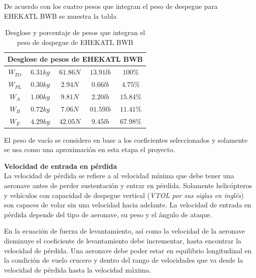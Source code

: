 De acuerdo con los cuatro pesos que integran el peso de despegue para EHEKATL BWB se muestra la tabla 
\begin{table}[!h]
    \centering
    \begin{tabular}{|c|c|c|c|c|}
    \hline
    \multicolumn{5}{|c|}{Desglose de pesos de EHEKATL BWB}\\
    \hline
     \textbf{$W_{TO}$} & \textbf{$6.31 kg$} & \textbf{$61.86 N$} & \textbf{$13.91 lb$} & $100 \% $  \\
     \hline
      $W_{PL}$ & \textit{$0.30 kg$} & \textit{$2.94  N$} & \textit{$0.66 lb$} & $ 4.75 \% $\\
      $W_{A}$  & \textit{$1.00 kg$} & \textit{$9.81  N$} & \textit{$2.20  lb$} &  $ 15.84 \% $  \\
      $W_{B}$  & \textit{$0.72 kg$} & \textit{$7.06  N$} & \textit{$01.59 lb$} &  $ 11.41 \% $ \\
      $W_{E}$  & \textit{$4.29 kg$} & \textit{$42.05  N$} & \textit{$9.45 lb$} &  $ 67.98 \% $ \\
    \hline
    \end{tabular}
    \caption{Desglose y porcentaje de pesos que integran el peso de despegue de EHEKATL BWB}
    \label{desglose y porcentaje de pesos}
\end{table}


El peso de vacío se considero en base a los coeficientes seleccionados y solamente  se usa como una aproximación en esta etapa el proyecto.

\bigskip
\textbf{Velocidad de entrada en pérdida}\\
La velocidad de pérdida se refiere a al velocidad mínima que debe tener una aeronave antes de perder sustentación y entrar en pérdida. Solamente helicópteros y vehículos con capacidad de despegue vertical (\textit{VTOL por sus siglas en inglés})  son capaces de volar sin una velocidad hacia adelante. 
La velocidad de entrada en pérdida depende del tipo de aeronave, su peso y el ángulo de ataque. 

En la ecuación de fuerza de levantamiento, así como la velocidad de la aeronave disminuye el coeficiente de levantamiento debe incrementar, hasta encontrar la velocidad de pérdida. 
Una aeronave debe poder estar en equilibrio longitudinal en la condición de vuelo crucero y dentro del rango de velocidades que va desde la velocidad de pérdida hasta la velocidad máxima. 


